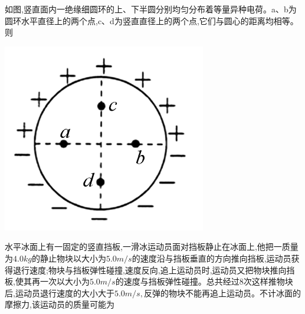 \question[6]如图,竖直面内一绝缘细圆环的上、下半圆分别均匀分布着等量异种电荷。a、b为圆环水平直径上的两个点,c、d为竖直直径上的两个点,它们与圆心的距离均相等。则
\begin{center}
\includegraphics[]{img/image4.png}
\end{center}

\begin{solution}{4cm}

\end{solution}



\question[6]水平冰面上有一固定的竖直挡板,一滑冰运动员面对挡板静止在冰面上,他把一质量为$4.0kg$的静止物块以大小为$5.0m/s$的速度沿与挡板垂直的方向推向挡板,运动员获得退行速度;物块与挡板弹性碰撞,速度反向,追上运动员时,运动员又把物块推向挡板,使其再一次以大小为$5.0m/s$的速度与挡板弹性碰撞。总共经过8次这样推物块后,运动员退行速度的大小大于$5.0m/s,$反弹的物块不能再追上运动员。不计冰面的摩擦力,该运动员的质量可能为
\begin{solution}{4cm}

\end{solution}



